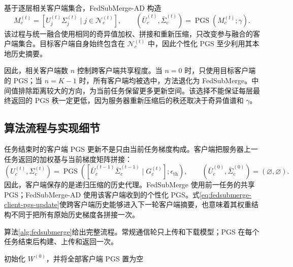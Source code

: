 基于逐层相关客户端集合，FedSubMerge-AD 构造
\begin{equation}
M_c^{(t)}
=
\left[
U_j^{(t)}\Sigma_j^{(t)}\mid j\in\mathcal{N}_c^{(t)}
\right],
\qquad
(\bar U_c^{(t)},\bar\Sigma_c^{(t)})
=
\operatorname{PGS}\!\left(M_c^{(t)};\gamma\right).
\label{eq:fedsubmerge-personalized-merge}
\end{equation}
该过程与统一融合使用相同的奇异值加权、拼接和重新压缩，只改变参与融合的客户端集合。目标客户端自身始终包含在 $\mathcal{N}_c^{(t)}$ 中，因此个性化 PGS 至少利用其本地历史摘要。

因此，相关客户端数 $n$ 控制跨客户端共享程度。当 $n=0$ 时，只使用目标客户端的 PGS；当 $n=K-1$ 时，所有客户端均被选中，方法退化为 FedSubMerge。中间值排除距离较大的方向，为当前任务保留更多更新空间。该选择不能保证每层最终返回的 PGS 秩一定更低，因为服务器重新压缩后的秩还取决于奇异值谱和 $\gamma$。

\subsection{算法流程与实现细节}
\label{subsec:fedsubmerge-algorithm}

任务结束时的客户端 PGS 更新不是只由当前任务梯度构成。客户端把服务器上一任务返回的加权基与当前梯度矩阵拼接：
\begin{equation}
(U_c^{(t)},\Sigma_c^{(t)})
=
\operatorname{PGS}\!\left(
\left[
\bar U_c^{(t-1)}\bar\Sigma_c^{(t-1)}
\mid
G_c^{(t)}
\right];
\epsilon_{\mathrm{th}}
\right),
\qquad
(\bar U_c^{(0)},\bar\Sigma_c^{(0)})=(\varnothing,\varnothing).
\label{eq:fedsubmerge-client-pgs-update}
\end{equation}
因此，客户端保存的是递归压缩的历史代理。FedSubMerge 使用前一任务的共享 PGS；FedSubMerge-AD 使用该客户端收到的个性化 PGS。式\eqref{eq:fedsubmerge-client-pgs-update}使跨客户端历史能够进入下一轮客户端摘要，也意味着其权重结构不同于把所有原始历史梯度各拼接一次。

算法\ref{alg:fedsubmerge}给出完整流程。常规通信轮只上传和下载模型；PGS 在每个任务结束后构建、上传和返回一次。

\begin{algorithm}[htbp]
\DontPrintSemicolon
{}
初始化 $W^{(0)}$，并将全部客户端 PGS 置为空\;
\caption{FedSubMerge 与 FedSubMerge-AD}
\label{alg:fedsubmerge}
\end{algorithm}

